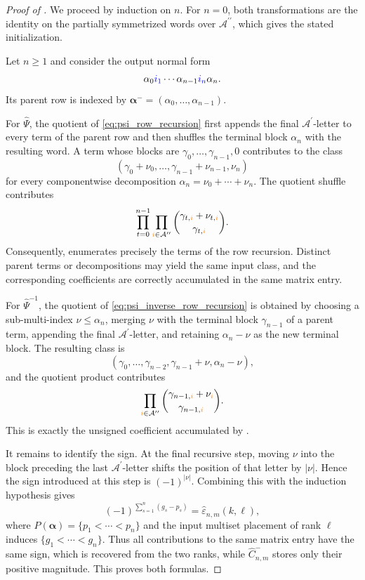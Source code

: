 \documentclass{amsart}
\theoremstyle{definition}
\theoremstyle{remark}
\newcommand{\blue}[1]{{\color{blue}#1}}
\newcommand{\orange}[1]{{\color{orange}#1}}
\begin{document}
\begin{proof}[Proof of ]
We proceed by induction on $n$. For $n=0$, both transformations are the
identity on the partially symmetrized words over
$\mathcal{A}^{\prime\prime}$, which gives the stated initialization.

Let $n\geq1$ and consider the output normal form
\[
    \alpha_0\blue{i_1}\cdots
    \alpha_{n-1}\blue{i_n}\alpha_n.
\]
Its parent row is indexed by
$\boldsymbol{\alpha}^{-}
=(\alpha_0,\ldots,\alpha_{n-1})$.

For $\widehat{\Psi}$, the quotient of
\eqref{eq:psi_row_recursion} first appends the final
$\mathcal{A}^{\prime}$-letter to every term of the parent row and then
shuffles the terminal block $\alpha_n$ with the resulting word. A term
whose blocks are
$\gamma_0,\ldots,\gamma_{n-1},0$ contributes to the class
\[
    \left(
        \gamma_0+\nu_0,
        \ldots,
        \gamma_{n-1}+\nu_{n-1},
        \nu_n
    \right)
\]
for every componentwise decomposition
$\alpha_n=\nu_0+\cdots+\nu_n$. The quotient shuffle contributes
\[
    \prod_{t=0}^{n-1}
    \prod_{\orange{i}\in\mathcal{A}^{\prime\prime}}
    \binom{
        \gamma_{t,\orange{i}}
        +
        \nu_{t,\orange{i}}
    }{
        \gamma_{t,\orange{i}}
    }.
\]
Consequently,  enumerates precisely the terms of the
row recursion. Distinct parent terms or decompositions may yield the same
input class, and the corresponding coefficients are correctly accumulated
in the same matrix entry.

For $\widehat{\Psi}^{-1}$, the quotient of
\eqref{eq:psi_inverse_row_recursion} is obtained by choosing a
sub-multi-index $\nu\leq\alpha_n$, merging $\nu$ with the terminal block
$\gamma_{n-1}$ of a parent term, appending the final
$\mathcal{A}^{\prime}$-letter, and retaining
$\alpha_n-\nu$ as the new terminal block. The resulting class is
\[
    \left(
        \gamma_0,\ldots,\gamma_{n-2},
        \gamma_{n-1}+\nu,
        \alpha_n-\nu
    \right),
\]
and the quotient product contributes
\[
    \prod_{\orange{i}\in\mathcal{A}^{\prime\prime}}
    \binom{
        \gamma_{n-1,\orange{i}}
        +
        \nu_{\orange{i}}
    }{
        \gamma_{n-1,\orange{i}}
    }.
\]
This is exactly the unsigned coefficient accumulated by
.

It remains to identify the sign. At the final recursive step, moving
$\nu$ into the block preceding the last
$\mathcal{A}^{\prime}$-letter shifts the position of that letter by
$|\nu|$. Hence the sign introduced at this step is
$(-1)^{|\nu|}$. Combining this with the induction hypothesis gives
\[
    (-1)^{
        \sum_{s=1}^{n}
        \left(
            g_s-p_s
        \right)
    }
    =
    \widehat{\varepsilon}_{n,m}(k,\ell),
\]
where
$P(\boldsymbol{\alpha})=\{p_1<\cdots<p_n\}$ and the input multiset
placement of rank $\ell$ induces
$\{g_1<\cdots<g_n\}$. Thus all contributions to the same matrix entry
have the same sign, which is recovered from the two ranks, while
$\widehat{C}^{-}_{n,m}$ stores only their positive magnitude. This proves
both formulas.
\end{proof}
\end{document}
